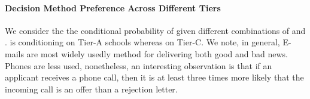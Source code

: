 		\paragraph{Decision Method Preference Across Different Tiers}
			We consider the the conditional probability of 
			given different combinations of 
			and .  is conditioning
			on Tier-A schools whereas  on Tier-C.
			We note, in general, E-mails are most widely usedly method
			for delivering both good and bad news. Phones are less used,
			nonetheless, an interesting observation is that if an applicant
			receives a phone call, then it is at least three times more likely
			that the incoming call is an offer than a rejection letter.
